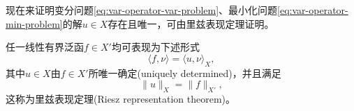 现在来证明变分问题\eqref{eq:var-operator-var-problem}、最小化问题\eqref{eq:var-operator-min-problem}的解$u \in X$存在且唯一，可由里兹表现定理证明。

\begin{theorem}[里兹表现定理]
  \label{theorem:var-riesz-representation-theorem}
  任一线性有界泛函$f \in X'$均可表现为下述形式
  \begin{equation*}
    \langle f, \nu \rangle = \langle u,\nu \rangle_{X},
  \end{equation*}
  其中$u \in X$由$f \in X'$所唯一确定(uniquely determined)，并且满足
  \begin{equation}
    \label{eq:var-riesz-representation-theorem}
    \big\| u \big\|_{X} = \big\| f \big\|_{X'},
  \end{equation}
  这称为里兹表现定理(Riesz representation theorem)。
\end{theorem}

